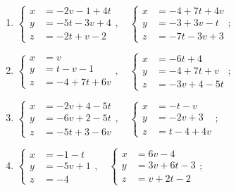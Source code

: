 	\vspace{10pt}
	\begin{enumerate}
		\setcounter{enumi}{\value{tasks}}

			\item \( \left\lbrace \begin{aligned}
						x &= -2v-1+4t \\
						y &= -5t-3v+4 \\
						z &= -2t+v-2
					\end{aligned} \right., \quad \left\lbrace \begin{aligned}
						x &= -4+7t+4v \\
						y &= -3+3v-t \\
						z &= -7t-3v+3
					\end{aligned} \right. \);
			\item \( \left\lbrace \begin{aligned}
						x &= v \\
						y &= t-v-1 \\
						z &= -4+7t+6v
					\end{aligned} \right., \quad \left\lbrace \begin{aligned}
						x &= -6t+4 \\
						y &= -4+7t+v \\
						z &= -3v+4-5t
					\end{aligned} \right. \);
			\item \( \left\lbrace \begin{aligned}
						x &= -2v+4-5t \\
						y &= -6v+2-5t \\
						z &= -5t+3-6v
					\end{aligned} \right., \quad \left\lbrace \begin{aligned}
						x &= -t-v \\
						y &= -2v+3 \\
						z &= t-4+4v
					\end{aligned} \right. \);
			\item \( \left\lbrace \begin{aligned}
						x &= -1-t \\
						y &= -5v+1 \\
						z &= -4
					\end{aligned} \right., \quad \left\lbrace \begin{aligned}
						x &= 6v-4 \\
						y &= 3v+6t-3 \\
						z &= v+2t-2
					\end{aligned} \right. \);

\end{enumerate}
